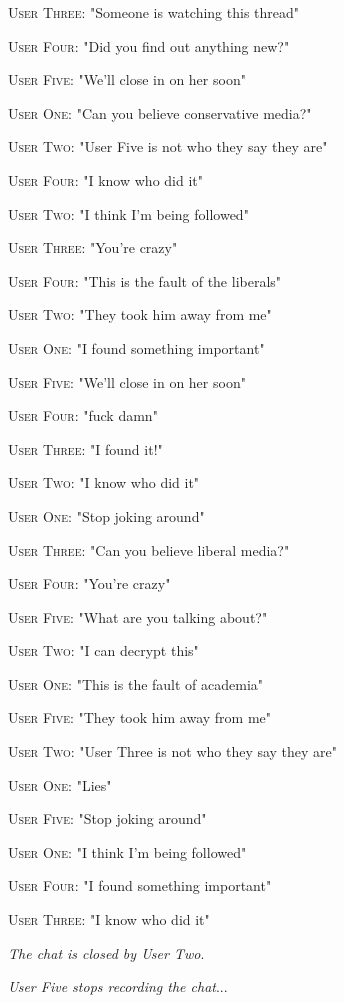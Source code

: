 \documentclass{report}
\begin{document}
\textsc{User Three}: "Someone is watching this thread" 

\textsc{User Four}: "Did you find out anything new?" 

\textsc{User Five}: "We'll close in on her soon" 

\textsc{User One}: "Can you believe conservative media?" 

\textsc{User Two}: "User Five is not who they say they are" 

\textsc{User Four}: "I know who did it" 

\textsc{User Two}: "I think I'm being followed" 

\textsc{User Three}: "You're crazy" 

\textsc{User Four}: "This is the fault of the liberals" 

\textsc{User Two}: "They took him away from me" 

\textsc{User One}: "I found something important" 

\textsc{User Five}: "We'll close in on her soon" 

\textsc{User Four}: "fuck damn" 

\textsc{User Three}: "I found it!" 

\textsc{User Two}: "I know who did it" 

\textsc{User One}: "Stop joking around" 

\textsc{User Three}: "Can you believe liberal media?" 

\textsc{User Four}: "You're crazy" 

\textsc{User Five}: "What are you talking about?" 

\textsc{User Two}: "I can decrypt this" 

\textsc{User One}: "This is the fault of academia" 

\textsc{User Five}: "They took him away from me" 

\textsc{User Two}: "User Three is not who they say they are" 

\textsc{User One}: "Lies" 

\textsc{User Five}: "Stop joking around" 

\textsc{User One}: "I think I'm being followed" 

\textsc{User Four}: "I found something important" 

\textsc{User Three}: "I know who did it" 

\textit{The chat is closed by User Two}. 

\textit{User Five stops recording the chat}...
\end{document}
